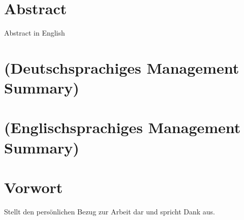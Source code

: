 \newpage
\thispagestyle{empty}
\chapter*{Abstract}\label{abstract}
Abstract in English



\chapter*{(Deutschsprachiges Management Summary)}\label{ManagementSummaryDE}



\chapter*{(Englischsprachiges Management Summary)}\label{ManagementSummaryEN}



\chapter*{Vorwort}\label{vorwort}
Stellt den persönlichen Bezug zur Arbeit dar und spricht Dank aus.